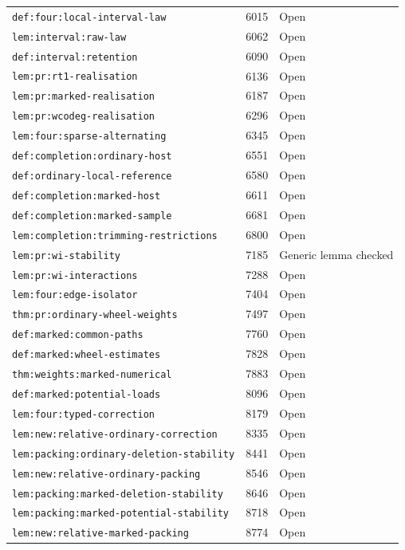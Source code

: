 \begin{longtable}{p{}r >{\raggedright\arraybackslash}p{}}
\nolinkurl{def:four:local-interval-law} & 6015 & Open \\
\nolinkurl{lem:interval:raw-law} & 6062 & Open \\
\nolinkurl{def:interval:retention} & 6090 & Open \\
\nolinkurl{lem:pr:rt1-realisation} & 6136 & Open \\
\nolinkurl{lem:pr:marked-realisation} & 6187 & Open \\
\nolinkurl{lem:pr:wcodeg-realisation} & 6296 & Open \\
\nolinkurl{lem:four:sparse-alternating} & 6345 & Open \\
\nolinkurl{def:completion:ordinary-host} & 6551 & Open \\
\nolinkurl{def:ordinary-local-reference} & 6580 & Open \\
\nolinkurl{def:completion:marked-host} & 6611 & Open \\
\nolinkurl{def:completion:marked-sample} & 6681 & Open \\
\nolinkurl{lem:completion:trimming-restrictions} & 6800 & Open \\
\nolinkurl{lem:pr:wi-stability} & 7185 & Generic lemma checked \\
\nolinkurl{lem:pr:wi-interactions} & 7288 & Open \\
\nolinkurl{lem:four:edge-isolator} & 7404 & Open \\
\nolinkurl{thm:pr:ordinary-wheel-weights} & 7497 & Open \\
\nolinkurl{def:marked:common-paths} & 7760 & Open \\
\nolinkurl{def:marked:wheel-estimates} & 7828 & Open \\
\nolinkurl{thm:weights:marked-numerical} & 7883 & Open \\
\nolinkurl{def:marked:potential-loads} & 8096 & Open \\
\nolinkurl{lem:four:typed-correction} & 8179 & Open \\
\nolinkurl{lem:new:relative-ordinary-correction} & 8335 & Open \\
\nolinkurl{lem:packing:ordinary-deletion-stability} & 8441 & Open \\
\nolinkurl{lem:new:relative-ordinary-packing} & 8546 & Open \\
\nolinkurl{lem:packing:marked-deletion-stability} & 8646 & Open \\
\nolinkurl{lem:packing:marked-potential-stability} & 8718 & Open \\
\nolinkurl{lem:new:relative-marked-packing} & 8774 & Open \\

\end{longtable}

